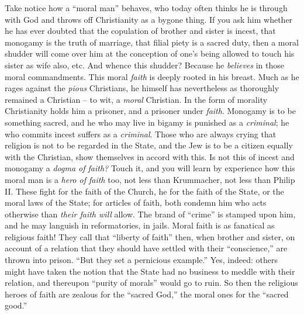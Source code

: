 \documentclass[12pt,a4paper]{book}
\begin{document}
Take notice how a ``moral man'' behaves, who today often thinks he is 
through with God and throws off Christianity as a bygone thing. If you ask him 
whether he has ever doubted that the copulation of brother and sister is 
incest, that monogamy is the truth of marriage, that filial piety is a sacred 
duty, then a moral shudder will come over him at the conception of one's being 
allowed to touch his sister as wife also, etc. And whence this shudder? 
Because he \textit{believes} in those moral commandments. This moral 
\textit{faith} is deeply rooted in his breast. Much as he rages against the 
\textit{pious} Christians, he himself has nevertheless as thoroughly remained 
a Christian -- to wit, a \textit{moral} Christian. In the form of morality 
Christianity holds him a prisoner, and a prisoner under \textit{faith}. 
Monogamy is to be something sacred, and he who may live in bigamy is punished 
as a \textit{criminal}; he who commits incest suffers as a \textit{criminal}. 
Those who are always crying that religion is not to be regarded in the State, 
and the Jew is to be a citizen equally with the Christian, show themselves in 
accord with this. Is not this of incest and monogamy a \textit{dogma of 
faith?} Touch it, and you will learn by experience how this moral man is a 
\textit{hero of faith} too, not less than Krummacher, not less than Philip II. 
These fight for the faith of the Church, he for the faith of the State, or the 
moral laws of the State; for articles of faith, both condemn him who acts 
otherwise than \textit{their faith will} allow. The brand of ``crime'' is 
stamped upon him, and he may languish in reformatories, in jails. Moral faith 
is as fanatical as religious faith! They call that ``liberty of faith'' 
then, when brother and sister, on account of a relation that they should have 
settled with their ``conscience,'' are thrown into prison. ``But they set a 
pernicious example.'' Yes, indeed: others might have taken the notion that 
the State had no business to meddle with their relation, and thereupon 
``purity of morals'' would go to ruin. So then the religious heroes of faith 
are zealous for the ``sacred God,'' the moral ones for the ``sacred 
good.''
\end{document}
